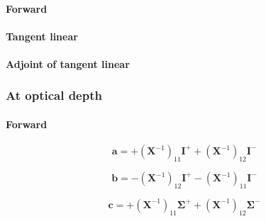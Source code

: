 \paragraph{Forward}
\label{sec:mem-radiance_at_levels-forward}


%
\paragraph{Tangent linear}
\label{sec:mem-radiance_at_levels-tangent_linear}


%
\paragraph{Adjoint of tangent linear}
\label{sec:mem-radiance_at_levels-adjoint_of_tangent_linear}


%
\subsubsection{At optical depth}
\label{sec:mem-radiance_at_optical_depth}


\paragraph{Forward}
\label{sec:mem-radiance_at_optical_depth-forward}

\begin{equation}
\mathbf{a} = +(\mathbf{X}^{-1})_{11}\mathbf{I}^{+} + (\mathbf{X}^{-1})_{12}\mathbf{I}^{-}
\label{eq:mem-radiance_at_optical_depth-forward-a}
\end{equation}

\begin{equation}
\mathbf{b} = -(\mathbf{X}^{-1})_{12}\mathbf{I}^{+} - (\mathbf{X}^{-1})_{11}\mathbf{I}^{-}
\label{eq:mem-radiance_at_optical_depth-forward-b}
\end{equation}

\begin{equation}
\mathbf{c} = +(\mathbf{X}^{-1})_{11}\mathbf{\Sigma}^{+} + (\mathbf{X}^{-1})_{12}\mathbf{\Sigma}^{-}
\label{eq:mem-radiance_at_optical_depth-forward-c}
\end{equation}

